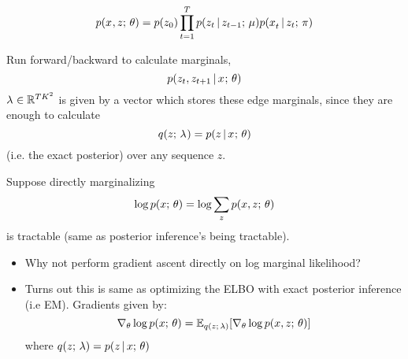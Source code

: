\begin{frame}
\begin{center}
\end{center} 
\[ p(x^{}, z ; \, \theta) =   p(z_0) \prod_{t=1}^T p(z_t \,|\, z_{t-1} ; \, \mu)p(x_t^{} \,|\, z_t ; \, \pi) \]
\end{frame}

\begin{frame}
Run forward/backward to calculate marginals,
\[ p(z_t, z_{t+1} \,|\, x^{} ; \, \theta) \]
\pause
$\lambda^{} \in \mathbb{R}^{TK^2}$ is given by a vector which stores these edge marginals, since they are enough to calculate 
\[  q(z ; \, \lambda^{}) = p(z \,|\, x^{} ; \, \theta) \] 
(i.e. the exact posterior) over any sequence $z$.
\end{frame}

\begin{frame}
Suppose directly marginalizing 
\[ \log p( x ; \,\theta) = \log \sum_{z} p (x , z ; \, \theta)\]
is tractable (same as posterior inference's being tractable).
\\
\begin{itemize}
    \item Why not perform gradient ascent directly on log marginal likelihood? \pause
    \item Turns out this is same as optimizing the ELBO with exact posterior inference (i.e EM). Gradients given by:
    \[   \nabla_\theta \log p(x ; \, \theta)  = \mathbb{E}_{q(z  ; \, \lambda)} [\nabla_\theta \log p(x, z ; \, \theta)] \] 
    where $q(z ; \, \lambda) = p(z \,|\, x ; \, \theta)$
\end{itemize}
 \end{frame}


